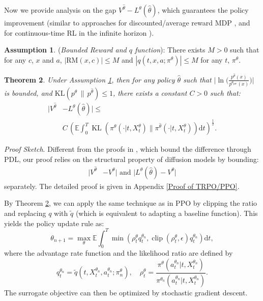\documentclass{article}
\theoremstyle{plain}
\newtheorem{theorem}{Theorem}[section]
\theoremstyle{definition}
\newtheorem{assumption}[theorem]{Assumption}
\theoremstyle{remark}
\begin{document}
Now we provide analysis on the gap $V^{\hat{\theta}} - L^{\theta}(\hat{\theta})$, which guarantees the policy improvement
(similar to approaches for discounted/average reward MDP \cite{schulman2015trust,zhang2021policy}, and for continuous-time RL in the infinite horizon \cite{zhao2024policy}).
\begin{assumption}
\label{Difference Bound Assumptions} ({\it Bounded Reward and $q$ function}): There exists $M > 0$ such that for any $c$, $x$ and $a$, $|\text{RM}(x,c)|\leq M$ and $|q(t,x,a;\pi^{\theta})|\leq M$ for any $t$, $\pi^{\theta}$.
\end{assumption}
\begin{theorem}
\label{thm:TRPO/PPO}
Under Assumption \ref{Difference Bound Assumptions}, then for any policy $\hat{\theta}$ such that $\bigl|\ln \bigl(\tfrac{p^{\hat{\theta}}(x)}{p^{\theta_{\mathrm{pre}}}(x)}\bigr)\bigr|$ is bounded, and $\mathrm{KL}(p^{\theta} \,\|\, p^{\hat{\theta}})\leq 1$, there exists a constant $C > 0$ such that:
\begin{align}
|V^{\hat{\theta}} & - L^{\theta}(\hat{\theta})|\leq \nonumber\\
&C \, \left(\mathbb{E}\int_{0}^{T} \operatorname{KL}(\pi^{\theta}(\cdot | t , X _ { t } ^ {\theta} )\|\pi^{\hat{\theta}}( \cdot | t , X _ { t } ^ {\theta} ))\mathrm{d}t\right)^{\frac{1}{2}}.
\end{align}
\end{theorem}
\vspace{-10pt}
\textit{Proof Sketch}. Different from the proofs in \cite{schulman2015trust,zhao2024policy}, which bound the difference through PDL, our proof relies on the structural property of diffusion models by bounding: 
\begin{align*}
|V^{\hat{\theta}} & - V^{\theta}|\text{ and }|L^{\theta}(\hat{\theta}) - V^{\theta}|
\end{align*}
separately. The detailed proof is given in Appendix \ref{Proof of TRPO/PPO}. 

By Theorem \ref{thm:TRPO/PPO}, we can apply the same technique as in PPO \cite{schulman2017proximal} by clipping the ratio and replacing $q$ with $\tilde{q}$ (which is equivalent to adapting a baseline function).
This yields the policy update rule as:
\begin{equation}
\theta_{n+1} = \max_\theta \mathbb{E}\int_{0}^{T}\min \left(\rho^{\theta}_{t} q^{\theta_{n}}_{t}, \operatorname{clip}\left(\rho^{\theta}_{t}, \epsilon\right) q^{\theta_{n}}_{t}\right)\mathrm{d}t,
\end{equation}
where the advantage rate function and the likelihood ratio are defined by
$$
q^{\theta_n}_{t}=\tilde{q}(t, X_t^{\theta_n}, a_t^{\theta_n} ; \pi^\theta_n),\quad \rho^{\theta}_{t}=\frac{\pi^ { \theta}( a _ { t } ^ {\theta_n} | t , X _ { t } ^ {\theta_n} )}{\pi^ { \theta_n}( a _ { t } ^ {\theta_n} | t , X _ { t } ^ {\theta_n} )}.
$$
The surrogate objective can then be optimized by stochastic gradient descent.
\end{document}
